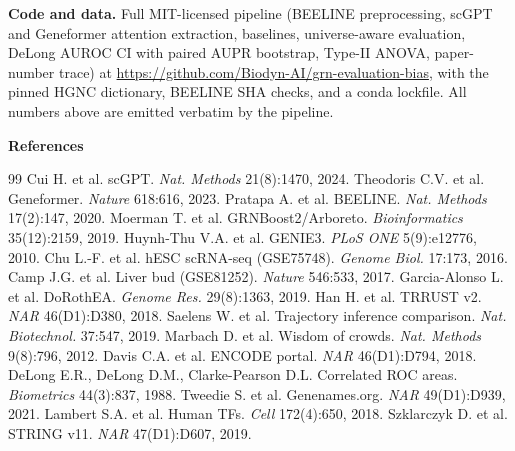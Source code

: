 \documentclass[sigconf, nonacm]{acmart}
\begin{document}
\textbf{Code and data.}
Full MIT-licensed pipeline (BEELINE preprocessing, scGPT and
Geneformer attention extraction, baselines, universe-aware
evaluation, DeLong AUROC CI with paired AUPR bootstrap, Type-II ANOVA,
paper-number trace) at
\url{https://github.com/Biodyn-AI/grn-evaluation-bias}, with the
pinned HGNC dictionary, BEELINE SHA checks, and a conda lockfile. All
numbers above are emitted verbatim by the pipeline.

\smallskip\noindent\textbf{\footnotesize References}
\begingroup
\scriptsize
\renewcommand{\section}[2]{}
\setlength{\bibsep}{0pt}
\begin{thebibliography}{99}
 Cui H. et al. scGPT. \emph{Nat. Methods} 21(8):1470, 2024.
 Theodoris C.V. et al. Geneformer. \emph{Nature} 618:616, 2023.
 Pratapa A. et al. BEELINE. \emph{Nat. Methods} 17(2):147, 2020.
 Moerman T. et al. GRNBoost2/Arboreto. \emph{Bioinformatics} 35(12):2159, 2019.
 Huynh-Thu V.A. et al. GENIE3. \emph{PLoS ONE} 5(9):e12776, 2010.
 Chu L.-F. et al. hESC scRNA-seq (GSE75748). \emph{Genome Biol.} 17:173, 2016.
 Camp J.G. et al. Liver bud (GSE81252). \emph{Nature} 546:533, 2017.
 Garcia-Alonso L. et al. DoRothEA. \emph{Genome Res.} 29(8):1363, 2019.
 Han H. et al. TRRUST v2. \emph{NAR} 46(D1):D380, 2018.
 Saelens W. et al. Trajectory inference comparison. \emph{Nat. Biotechnol.} 37:547, 2019.
 Marbach D. et al. Wisdom of crowds. \emph{Nat. Methods} 9(8):796, 2012.
 Davis C.A. et al. ENCODE portal. \emph{NAR} 46(D1):D794, 2018.
 DeLong E.R., DeLong D.M., Clarke-Pearson D.L. Correlated ROC areas. \emph{Biometrics} 44(3):837, 1988.
 Tweedie S. et al. Genenames.org. \emph{NAR} 49(D1):D939, 2021.
 Lambert S.A. et al. Human TFs. \emph{Cell} 172(4):650, 2018.
 Szklarczyk D. et al. STRING v11. \emph{NAR} 47(D1):D607, 2019.
\end{thebibliography}
\endgroup
\end{document}
